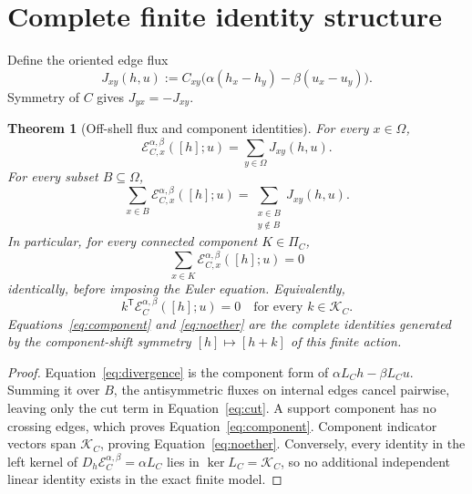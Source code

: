 \documentclass[11pt]{article}
\newtheorem{theorem}{Theorem}
\newcommand{\Kspace}{\mathcal K_C}
\newcommand{\Eop}{\mathcal E_C^{\alpha,\beta}}
\begin{document}
\section{Complete finite identity structure}

Define the oriented edge flux
\begin{equation}
 J_{xy}(h,u)
 :=C_{xy}\bigl(\alpha(h_x-h_y)-\beta(u_x-u_y)\bigr).
 \label{eq:flux}
\end{equation}
Symmetry of \(C\) gives \(J_{yx}=-J_{xy}\).

\begin{theorem}[Off-shell flux and component identities]
\label{thm:identity}
For every \(x\in\Omega\),
\begin{equation}
 \mathcal E_{C,x}^{\alpha,\beta}([h];u)
 =\sum_{y\in\Omega}J_{xy}(h,u).
 \label{eq:divergence}
\end{equation}
For every subset \(B\subseteq\Omega\),
\begin{equation}
 \sum_{x\in B}\mathcal E_{C,x}^{\alpha,\beta}([h];u)
 =\sum_{\substack{x\in B\\y\notin B}}J_{xy}(h,u).
 \label{eq:cut}
\end{equation}
In particular, for every connected component \(K\in\Pi_C\),
\begin{equation}
 \sum_{x\in K}\mathcal E_{C,x}^{\alpha,\beta}([h];u)=0
 \label{eq:component}
\end{equation}
identically, before imposing the Euler equation.  Equivalently,
\begin{equation}
 k^{\mathsf T}\Eop([h];u)=0
 \quad\text{for every }k\in\Kspace.
 \label{eq:noether}
\end{equation}
Equations~\eqref{eq:component} and \eqref{eq:noether} are the complete
identities generated by the component-shift symmetry
\([h]\mapsto[h+k]\) of this finite action.
\end{theorem}

\begin{proof}
Equation~\eqref{eq:divergence} is the component form of
\(\alpha L_Ch-\beta L_Cu\).  Summing it over \(B\), the antisymmetric
fluxes on internal edges cancel pairwise, leaving only the cut term in
Equation~\eqref{eq:cut}.  A support component has no crossing edges, which
proves Equation~\eqref{eq:component}.  Component indicator vectors span
\(\Kspace\), proving Equation~\eqref{eq:noether}.  Conversely, every
identity in the left kernel of \(D_h\Eop=\alpha L_C\) lies in
\(\ker L_C=\Kspace\), so no additional independent linear identity exists
in the exact finite model.
\end{proof}
\end{document}

